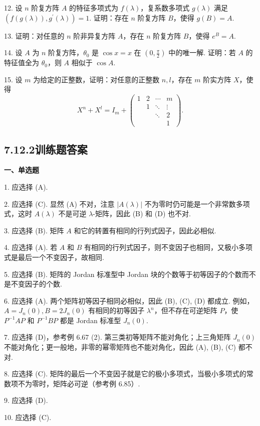 \documentclass[UTF8, 12pt, fontset=fandol, oneside]{ctexart}
\begin{document}
12. 设 $n$ 阶复方阵 $A$ 的特征多项式为 $f(\lambda)$，复系数多项式 $g(\lambda)$ 满足 $(f(g(\lambda)),g^{\prime}(\lambda))=1$. 证明：存在 $n$ 阶复方阵 $B$，使得 $g(B)=A$.

13. 证明：对任意的 $n$ 阶非异复方阵 $A$，存在 $n$ 阶复方阵 $B$，使得 $e^B=A$.

14. 设 $A$ 为 $n$ 阶复方阵，$\theta_0$ 是 $\cos x=x$ 在 $(0,\frac{\pi}{2})$ 中的唯一解. 证明：若 $A$ 的特征值全为 $\theta_0$，则 $A$ 相似于 $\cos A$.

15. 设 $m$ 为给定的正整数，证明：对任意的正整数 $n,l$，存在 $m$ 阶实方阵 $X$，使得
\[
X^n+X^l=I_m+\left(\begin{array}{ccccc}
1&2&\cdots&m\\
&1&\ddots&\vdots\\
&&\ddots&2\\
&&&1
\end{array}\right).
\]

\subsection*{7.12.2\quad 训练题答案}

\noindent\textbf{一、单选题}

1. 应选择 (A).

2. 应选择 (C). 显然 (A) 不对，注意 $|A(\lambda)|$ 不为零时仍可能是一个非常数多项式，这时 $A(\lambda)$ 不是可逆 $\lambda$-矩阵，因此 (B) 和 (D) 也不对.

3. 应选择 (B). 矩阵 $A$ 和它的转置有相同的行列式因子，因此必相似.

4. 应选择 (A). 若 $A$ 和 $B$ 有相同的行列式因子，则不变因子也相同，又极小多项式是最后一个不变因子，故相同.

5. 应选择 (B). 矩阵的 Jordan 标准型中 Jordan 块的个数等于初等因子的个数而不是不变因子的个数.

6. 应选择 (A). 两个矩阵初等因子相同必相似，因此 (B), (C), (D) 都成立. 例如，$A=J_n(0),B=2J_n(0)$ 有相同的初等因子 $\lambda^n$，但不存在可逆矩阵 $P$，使 $P^{-1}AP$ 和 $P^{-1}BP$ 都是 Jordan 标准型 $J_n(0)$.

7. 应选择 (D)，参考例 6.67 (2). 第三类初等矩阵不能对角化；上三角矩阵 $J_n(0)$ 不能对角化；更一般地，非零的幂零矩阵也不能对角化，因此 (A), (B), (C) 都不对.

8. 应选择 (C). 矩阵的最后一个不变因子就是它的极小多项式，当极小多项式的常数项不为零时，矩阵必可逆（参考例 6.85）.

9. 应选择 (D).

10. 应选择 (C).
\end{document}
